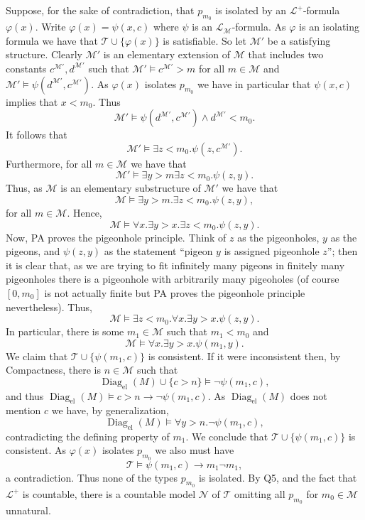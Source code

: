 \documentclass{article}
\theoremstyle{theorem}
\DeclareMathOperator{\Diag}{Diag}
\begin{document}
\begin{enumerate}[leftmargin=*]
		Suppose, for the sake of contradiction, that $p_{m_0}$ is isolated by an $\mathcal{L}^+$-formula $\varphi(x)$. Write $\varphi(x) = \psi(x,c)$ where $\psi$ is an $\mathcal{L}_{\mathcal{M}}$-formula. As $\varphi$ is an isolating formula we have that $\mathcal{T}\cup\{\varphi(x)\}$ is satisfiable. So let $\mathcal{M}'$ be a satisfying structure. Clearly $\mathcal{M}'$ is an elementary extension of $\mathcal{M}$ that includes two constants $c^{\mathcal{M}'},d^{\mathcal{M'}}$ such that $\mathcal{M'} \models c^{\mathcal{M}'} > m$ for all $m\in\mathcal{M}$ and $\mathcal{M'} \models \psi(d^{\mathcal{M'}},c^{\mathcal{M'}})$. As $\varphi(x)$ isolates $p_{m_0}$ we have in particular that $\psi(x,c)$ implies that $x < m_0$. Thus
		\[
			\mathcal{M}' \models \psi(d^{\mathcal{M'}},c^{\mathcal{M'}}) \wedge d^{\mathcal{M'}} < m_0.
		\]
		It follows that 
		\[
			\mathcal{M}' \models \exists z < m_0. \psi(z,c^{\mathcal{M'}}).
		\]
		Furthermore, for all $m\in \mathcal{M}$ we have that 
		\[
			\mathcal{M}' \models \exists y > m \exists z < m_0. \psi(z,y).
		\]
		Thus, as $\mathcal{M}$ is an elementary substructure of $\mathcal{M}'$ we have that 
		\[
			\mathcal{M} \models \exists y > m. \exists z < m_0. \psi(z,y),
		\]
		for all $m\in\mathcal{M}$. Hence,
		\[
		\mathcal{M} \models \forall x. \exists y > x.\exists z < m_0. \psi(z,y).
		\]
		Now, PA proves the pigeonhole principle. Think of $z$ as the pigeonholes, $y$ as the pigeons, and $\psi(z,y)$ as the statement ``pigeon $y$ is assigned pigeonhole $z$''; then it is clear that, as we are trying to fit infinitely many pigeons in finitely many pigeonholes there is a pigeonhole with arbitrarily many pigeoholes (of course $[0,m_0]$ is not actually finite but PA proves the pigeonhole principle nevertheless). Thus,
		\[
		\mathcal{M} \models \exists z < m_0.\forall x. \exists y > x. \psi(z,y).
		\]
		In particular, there is some $m_1\in \mathcal{M}$ such that $m_1< m_0$ and 
		\[
		\mathcal{M} \models \forall x. \exists y > x. \psi(m_1,y).
		\]
		We claim that $\mathcal{T}\cup\{\psi(m_1,c)\}$ is consistent. If it were inconsistent then, by Compactness, there is $n\in \mathcal{M}$ such that
		\[
			\Diag_{\text{el}}(M) \cup \{c> n\} \models \neg\psi(m_1,c),
		\]
		and thus $\Diag_{\text{el}}(M) \models c > n \rightarrow \neg\psi(m_1,c)$. As $\Diag_{\text{el}}(M)$ does not mention $c$ we have, by generalization, 
		\[
			\Diag_{\text{el}}(M) \models \forall y> n. \neg\psi(m_1,c),
		\]
		contradicting the defining property of $m_1$. We conclude that $\mathcal{T}\cup\{\psi(m_1,c)\}$ is consistent. As $\varphi(x)$ isolates $p_{m_0}$ we also must have
		\[
			\mathcal{T} \models \psi(m_1,c) \rightarrow m_1 \neg m_1,
		\]
		a contradiction. Thus none of the types $p_{m_0}$ is isolated. By Q5, and the fact that $\mathcal{L}^+$ is countable, there is a countable model $\mathcal{N}$ of $\mathcal{T}$ omitting all $p_{m_0}$ for $m_0\in \mathcal{M}$ unnatural.
		

\end{enumerate}
\end{document}

